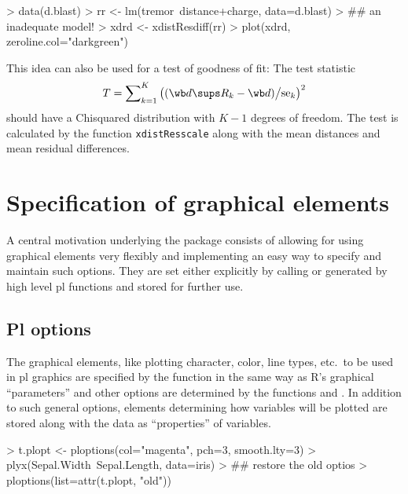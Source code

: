 \documentclass[11pt]{article}
\begin{document}
\begin{Schunk}
\begin{Sinput}
> data(d.blast)
> rr <- lm(tremor~distance+charge, data=d.blast)
> ## an inadequate model!
> xdrd <- xdistResdiff(rr)
> plot(xdrd, zeroline.col="darkgreen")
\end{Sinput}
\end{Schunk}

This idea can also be used for a test of goodness of fit: The test
statistic 
$$
  T = \sum\nolimits_{k=1}^K \left((\wb d\sups R_k-\wb d)\big/\mbox{se}_k\right)^2
$$
should have a Chisquared distribution with $K-1$ degrees of freedom.
The test is calculated by the function \texttt{xdistResscale} along with
the mean distances and mean residual differences.

\section{Specification of graphical elements}
A central motivation underlying the  package consists of
allowing for using graphical elements very flexibly and implementing an
easy way to specify and maintain such options.
They are set either explicitly by calling  or generated
by high level pl functions and stored for further use.

\subsection{Pl options}
The graphical elements, like plotting character, color, line types, etc.\ 
to be used in pl graphics are specified by the function 
in the same way as R's graphical ``parameters'' and other options are 
determined by the functions \T{par} and \T{options}.
In addition to such general options, 
elements determining how variables will be plotted are stored along 
with the data as ``properties'' of variables.

\begin{Schunk}
\begin{Sinput}
> t.plopt <- ploptions(col="magenta", pch=3, smooth.lty=3)
> plyx(Sepal.Width~Sepal.Length, data=iris)
> ## restore the old optios
> ploptions(list=attr(t.plopt, "old"))
\end{Sinput}
\end{Schunk}
\end{document}
